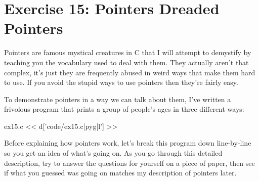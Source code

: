 \chapter{Exercise 15: Pointers Dreaded Pointers}

Pointers are famous mystical creatures in C that I will attempt to
demystify by teaching you the vocabulary used to deal with them.  They
actually aren't that complex, it's just they are frequently abused
in weird ways that make them hard to use.  If you avoid the stupid
ways to use pointers then they're fairly easy.

To demonstrate pointers in a way we can talk about them, I've
written a frivolous program that prints a group of people's
ages in three different ways:

\begin{code}{ex15.c}
<< d['code/ex15.c|pyg|l'] >>
\end{code}

Before explaining how pointers work, let's break this program down
line-by-line so you get an idea of what's going on.  As you go
through this detailed description, try to answer the questions for 
yourself on a piece of paper, then see if what you guessed was
going on matches my description of pointers later.

